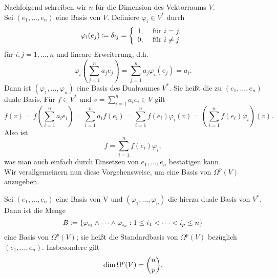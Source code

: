 \documentclass[a4paper,twoside,DIV15,BCOR12mm]{scrbook}
\begin{document}
\bigskip

 Nachfolgend schreiben wir $n$ für die 
Dimension des Vektorraums $V$.\\

 Sei $(e_{1},\dots,e_{n})$ eine Basis 
von $V$. Definiere $\varphi_{i} \in V^{*}$ durch
\[ \varphi_{i}(e_{j}) \da  \delta_{ij} = \left\{ \begin{array}{ll} 1, & 
\mbox{ für } i = j, \\
0, & \mbox{ für } i \not= j \end{array} \right. \]
für $i, j = 1,\dots,n$ und lineare Erweiterung, d.h.
\[ \varphi_{i}\left(\sum_{j=1}^{n}a_{j}e_{j}\right) = \sum_{j=1}^{n} 
a_{j} \varphi_{i}(e_{j}) = a_{i}. \]
Dann ist $(\varphi_{1},\dots,\varphi_{n})$ eine Basis des Dualraumes 
$V^{*}$. Sie heißt die zu $(e_{1},\dots,e_{n})$ duale Basis. Für $f 
\in V^{*}$ und $v = \sum_{i=1}^{n} a_{i}e_{i} \in V$ gilt
\[
f(v)  =  f\left(\sum_{i=1}^{n}a_{i}e_{i}\right) = \sum_{i=1}^{n} 
a_{i}f(e_{i}) = \sum_{i=1}^{n}f(e_{i}) \varphi_{i}(v) 
 =  \left(\sum_{i=1}^{n} f(e_{i}) \varphi_{i}\right) (v).
\]
Also ist
\[ f = \sum_{i=1}^{n} f(e_{i})\varphi_{i},\]
was man auch einfach durch Einsetzen von $e_1,\ldots,e_n$ bestätigen kann.\\
 
\noindent
Wir verallgemeinern nun diese Vorgehensweise, um eine Basis von 
$\Omega^{p}(V)$ anzugeben.

\bigskip

\begin{satz}\label{Satz3.3.6} {Sei $(e_{1},\dots,e_{n})$ eine Basis 
von V und $(\varphi_{1},\dots,\varphi_{n})$ die hierzu duale Basis von $V^*$. Dann ist 
die Menge
\[ B \da  \{ \varphi_{i_1} \wedge \dots \wedge \varphi_{i_p} : 1 \le 
i_{1} < \dots < i_{p} \le n\} \]
eine Basis von $\Omega^{p}(V)$; sie heißt die Standardbasis von $\Omega^p(V)$  bezüglich 
$(e_{1},\dots,e_{n})$. Insbesondere gilt}
\[ {\rm dim}\, \Omega^{p}(V) = {n \choose p}. \]
\end{satz}

\bigskip
\end{document}
